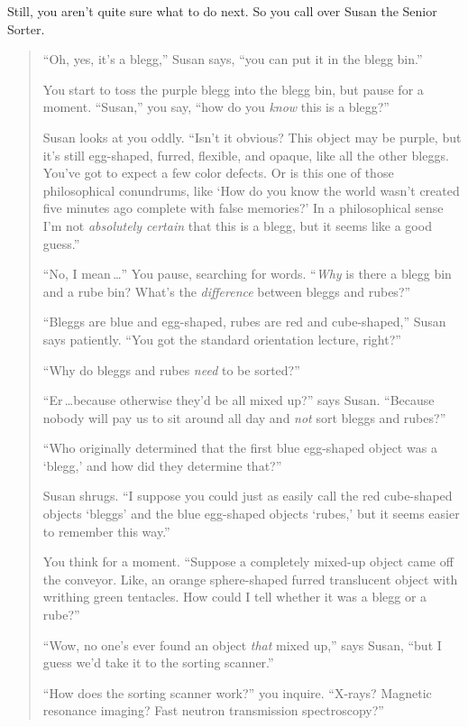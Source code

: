 { Still, you aren't quite sure what to do next. So
you call over Susan the Senior Sorter.

\begin{quotation}

 ``Oh, yes, it's a
blegg,'' Susan says, ``you can put
it in the blegg bin.''


 You start to toss the purple blegg into the blegg bin, but pause
for a moment. ``Susan,'' you say,
``how do you \textit{know} this is a
blegg?''


 Susan looks at you oddly. ``Isn't
it obvious? This object may be purple, but it's still
egg-shaped, furred, flexible, and opaque, like all the other bleggs.
You've got to expect a few color defects. Or is this
one of those philosophical conundrums, like `How do you
know the world wasn't created five minutes ago complete
with false memories?' In a philosophical sense
I'm not \textit{absolutely certain} that this is a
blegg, but it seems like a good guess.''


 ``No, I mean\,\ldots'' You pause,
searching for words. ``\textit{Why} is there a blegg
bin and a rube bin? What's the \textit{difference}
between bleggs and rubes?''


 ``Bleggs are blue and egg-shaped, rubes are red
and cube-shaped,'' Susan says patiently.
``You got the standard orientation lecture,
right?''


 ``Why do bleggs and rubes \textit{need} to be
sorted?''


 ``Er\,\ldots because otherwise
they'd be all mixed up?'' says Susan.
``Because nobody will pay us to sit around all day and
\textit{not} sort bleggs and rubes?''


 ``Who originally determined that the first blue
egg-shaped object was a `blegg,' and how
did they determine that?''


 Susan shrugs. ``I suppose you could just as
easily call the red cube-shaped objects
`bleggs' and the blue egg-shaped objects
`rubes,' but it seems easier to remember
this way.''


 You think for a moment. ``Suppose a completely
mixed-up object came off the conveyor. Like, an orange sphere-shaped
furred translucent object with writhing green tentacles. How could I
tell whether it was a blegg or a rube?''


 ``Wow, no one's ever found an
object \textit{that} mixed up,'' says Susan,
``but I guess we'd take it to the
sorting scanner.''


 ``How does the sorting scanner
work?'' you inquire. ``X-rays?
Magnetic resonance imaging? Fast neutron transmission
spectroscopy?''



\end{quotation}}
